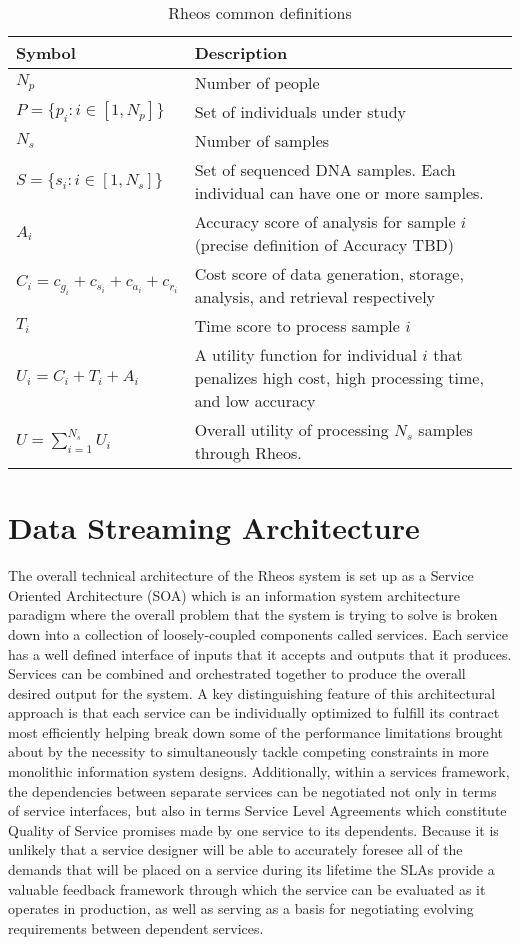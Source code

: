 \begin{table}[!ht]
    \caption{Rheos common definitions}
    \label{tab:rheos_notation}
    {\begin{tabular}{lp{7cm}}
    \toprule
    Symbol & Description \\
    \midrule
    $N_p$ & Number of people \\
    $P = \{p_i : i \in [1,N_p]\}$ & Set of individuals under study \\
    $N_s$ & Number of samples \\
    $S = \{s_i : i \in [1,N_s]\}$ & Set of sequenced DNA samples. Each individual can have one or more samples. \\
    $A_i $ & Accuracy score of analysis for sample $i$ (precise definition of Accuracy TBD) \\
    $C_i = c_{g_i} + c_{s_i} + c_{a_i} + c_{r_i}$ & Cost score of data generation, storage, analysis, and retrieval respectively \\
    $T_i$ & Time score to process sample $i$ \\
    $U_i = C_i + T_i + A_i$ & A utility function for individual $i$ that penalizes high cost, high processing time, and low accuracy\\
    $U = \sum_{i=1}^{N_s} U_i$ & Overall utility of processing $N_s$ samples through Rheos.\\
    \bottomrule
    \end{tabular}}
\end{table}


\section{Data Streaming Architecture}

The overall technical architecture of the Rheos system is set up as a Service Oriented Architecture (SOA)\autocite{shaw1996software} which is an information system architecture paradigm where the overall problem that the system is trying to solve is broken down into a collection of loosely-coupled components called services. Each service has a well defined interface of inputs that it accepts and outputs that it produces. Services can be combined and orchestrated together to produce the overall desired output for the system. A key distinguishing feature of this architectural approach is that each service can be individually optimized to fulfill its contract most efficiently helping break down some of the performance limitations brought about by the necessity to simultaneously tackle competing constraints in more monolithic information system designs. Additionally, within a services framework, the dependencies between separate services can be negotiated not only in terms of service interfaces, but also in terms Service Level Agreements which constitute Quality of Service promises made by one service to its dependents\autocite{ingham2000constructing}. Because it is unlikely that a service designer will be able to accurately foresee all of the demands that will be placed on a service during its lifetime the SLAs provide a valuable feedback framework through which the service can be evaluated as it operates in production, as well as serving as a basis for negotiating evolving requirements between dependent services.

